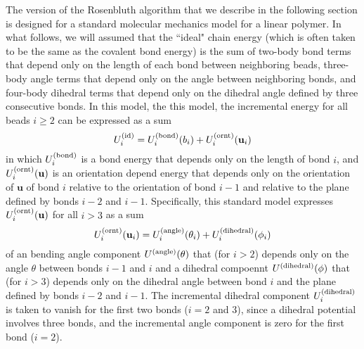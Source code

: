 \documentclass[12pt]{article} %
\newcommand{\vv}[1]{\mathbf{#1}}
\newcommand\Uid{U^{({\rm id})}}
\newcommand\ubond{\vv{u}}
\newcommand\rbond{b}
\newcommand\Ubond{U^{({\rm bond})}}
\newcommand\Uornt{U^{({\rm ornt})}}
\newcommand\Uangle{U^{({\rm angle})}}
\newcommand\Udihedral{U^{({\rm dihedral})}}
\begin{document}
The version of the Rosenbluth algorithm that we describe in the following section is designed for a standard molecular mechanics model for a linear polymer. In what follows, we will assumed that the ``ideal" chain energy (which is often taken to be the same as the covalent bond energy) is the sum of two-body bond terms that depend only on the length of each bond between neighboring beads, three-body angle terms that depend only on the angle between neighboring bonds, and four-body dihedral terms that depend only on the dihedral angle defined by three consecutive bonds. In this model, the this model, the incremental energy for all beads $i \geq 2$ can be expressed as a sum
\begin{equation}
   \Uid_{i} = \Ubond_{i}(\rbond_{i}) + \Uornt_{i}(\ubond_{i})
\end{equation}
in which $\Ubond_{i}$ is a bond energy that depends only on the length of bond $i$, and $\Uornt_{i}(\ubond)$ is an orientation depend energy that depends only on the orientation of $\ubond$ of bond $i$ relative to the orientation of bond $i-1$ and relative to the plane defined by bonds $i-2$ and $i-1$. Specifically, this standard model expresses $\Uornt_{i}(\ubond)$ for all $i > 3$ as a sum
\begin{equation}
   \Uornt_{i}(\ubond_{i}) = \Uangle_{i}(\theta_{i}) + \Udihedral_{i}(\phi_{i}) 
\end{equation}
of an bending angle component $\Uangle(\theta)$ that (for $i>2$) depends only on the angle $\theta$ between bonds $i-1$ and $i$ and a dihedral compoennt $\Udihedral(\phi)$ that (for $i > 3$) depends only on the dihedral angle between bond $i$ and the plane defined by bonds $i-2$ and $i-1$. The incremental dihedral component $\Udihedral_{i}$ is taken to vanish for the first two bonds ($i=2$ and $3$), since a dihedral potential involves three bonds, and the incremental angle component is zero for the first bond ($i=2$). 
\end{document}
